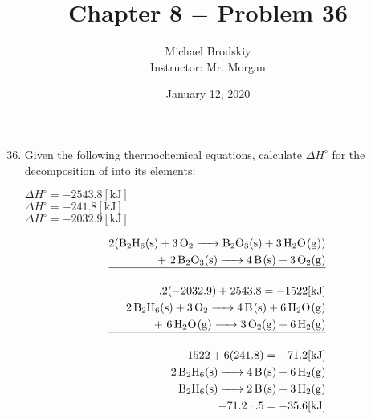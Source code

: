 \documentclass[12pt]{article}
\title{Chapter 8 $-$ Problem 36}
\date{January 12, 2020}
\author{Michael Brodskiy\\ \small Instructor: Mr. Morgan}
\begin{document}
\maketitle

\begin{enumerate}

    \setcounter{enumi}{35}

  \item Given the following thermochemical equations, calculate $\Delta H^{\circ}$ for the decomposition of  into its elements:

    \begin{center}
       \hspace{30pt} $\Delta H^{\circ}=-2543.8[\si{\kilo\joule}]$\\
       \hspace{30pt} $\Delta H^{\circ}=-241.8[\si{\kilo\joule}]$\\
       \hspace{25pt}  $\Delta H^{\circ}=-2032.9[\si{\kilo\joule}]$\\
    \end{center}

    \begin{equation}
      \begin{split}
        2(\ce{B2H6(s) + 3O2 -> B2O3(s) + 3H2O(g)})\\
        +\,\,\ce{2B2O3(s) -> 4B(s) + 3O2(g)}\\
        \hline\\
        .2(-2032.9)+2543.8=-1522[\si{\kilo\joule}]\\
        \ce{2B2H6(s) + 3O2 -> 4B(s) + 6H2O(g)}\\
        +\,\,\ce{6H2O(g) -> 3O2(g) + 6H2(g)}\\
        \hline\\
        -1522+6(241.8)=-71.2[\si{\kilo\joule}]\\
        \ce{2B2H6(s) -> 4B(s) + 6H2(g)}\\
        \ce{B2H6(s) -> 2B(s) + 3H2(g)}\\
        -71.2\cdot.5=-35.6[\si{\kilo\joule}]\\
      \end{split}
      \label{1}
    \end{equation}

\end{enumerate}
\end{document}
